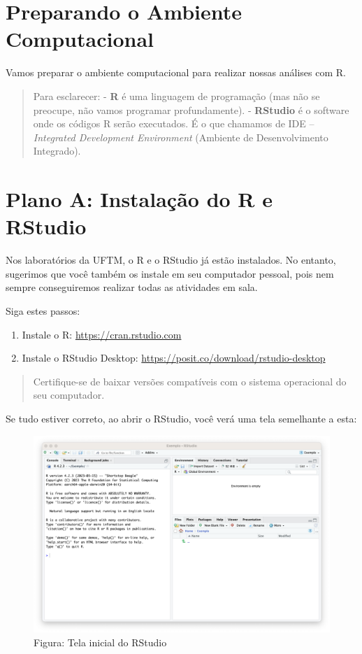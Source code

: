 \documentclass[
]{book}
\providecommand{\tightlist}{%
  \setlength{\itemsep}{0pt}\setlength{\parskip}{0pt}}
\begin{document}
\section{Preparando o Ambiente Computacional}\label{preparando-o-ambiente-computacional}

Vamos preparar o ambiente computacional para realizar nossas análises com R.

\begin{quote}
Para esclarecer:
- \textbf{R} é uma linguagem de programação (mas não se preocupe, não vamos programar profundamente).
- \textbf{RStudio} é o software onde os códigos R serão executados. É o que chamamos de IDE -- \emph{Integrated Development Environment} (Ambiente de Desenvolvimento Integrado).
\end{quote}

\section{Plano A: Instalação do R e RStudio}\label{plano-a-instalauxe7uxe3o-do-r-e-rstudio}

Nos laboratórios da UFTM, o R e o RStudio já estão instalados. No entanto, sugerimos que você também os instale em seu computador pessoal, pois nem sempre conseguiremos realizar todas as atividades em sala.

Siga estes passos:

\begin{enumerate}
\def\labelenumi{\arabic{enumi}.}
\tightlist
\item
  Instale o R: \url{https://cran.rstudio.com}
\item
  Instale o RStudio Desktop: \url{https://posit.co/download/rstudio-desktop}
\end{enumerate}

\begin{quote}
Certifique-se de baixar versões compatíveis com o sistema operacional do seu computador.
\end{quote}

Se tudo estiver correto, ao abrir o RStudio, você verá uma tela semelhante a esta:

\begin{figure}
\centering
\includegraphics{telaRStudio.png}
\caption{Figura: Tela inicial do RStudio}
\end{figure}
\end{document}

